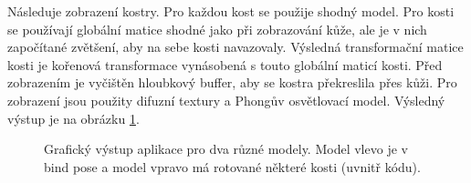 Následuje zobrazení kostry. Pro každou kost se použije shodný model. Pro kosti se používají globální matice shodné jako při zobrazování kůže, ale je v nich započítané zvětšení, aby na sebe kosti navazovaly.  Výsledná transformační matice kosti je kořenová transformace vynásobená s touto globální maticí kosti. Před zobrazením je vyčištěn hloubkový buffer, aby se kostra překreslila přes kůži. Pro zobrazení jsou použity difuzní textury a Phongův osvětlovací model. Výsledný výstup je na obrázku \ref{graphical_output}.

\begin{figure}[h]
\begin{center}
\qquad
{}
\caption{Grafický výstup aplikace pro dva různé modely. Model \cite{male_mesh} vlevo je v bind pose a model \cite{venom} vpravo má rotované některé kosti (uvnitř kódu).} \label{graphical_output}
\end{center}
\end{figure}

